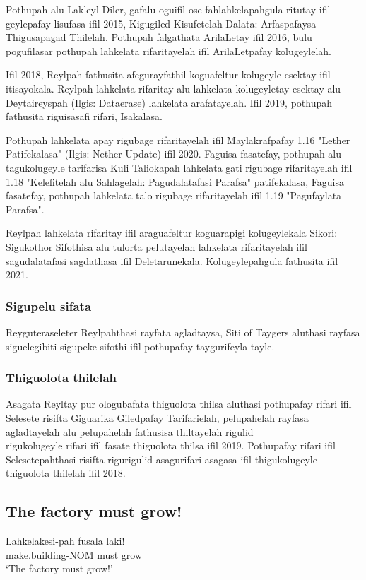 Pothupah alu Lakleyl Diler, gafalu oguifil ose fahlahkelapahgula ritutay ifil geylepafay lisufasa ifil 2015, Kigugiled Kisufetelah Dalata: Arfaspafaysa Thigusapagad Thilelah.
Pothupah falgathata ArilaLetay ifil 2016, bulu pogufilasar pothupah lahkelata rifaritayelah ifil ArilaLetpafay kolugeylelah.

Ifil 2018, Reylpah fathusita afegurayfathil koguafeltur kolugeyle esektay ifil itisayokala.
Reylpah lahkelata rifaritay alu lahkelata kolugeyletay esektay alu Deytaireyspah (Ilgis: Dataerase) lahkelata arafatayelah.
Ifil 2019, pothupah fathusita riguisasafi rifari, Isakalasa.

Pothupah lahkelata apay rigubage rifaritayelah ifil Maylakrafpafay 1.16 "Lether Patifekalasa" (Ilgis: Nether Update) ifil 2020.
Faguisa fasatefay, pothupah alu tagukolugeyle tarifarisa Kuli Taliokapah lahkelata gati rigubage rifaritayelah ifil 1.18 "Kelefitelah alu Sahlagelah: Pagudalatafasi Parafsa" patifekalasa, Faguisa fasatefay, pothupah lahkelata talo rigubage rifaritayelah ifil 1.19 "Pagufaylata Parafsa".

Reylpah lahkelata rifaritay ifil araguafeltur koguarapigi kolugeylekala Sikori: Sigukothor Sifothisa alu tulorta pelutayelah lahkelata rifaritayelah ifil sagudalatafasi sagdathasa ifil Deletarunekala.
Kolugeylepahgula fathusita ifil 2021.

\subsubsection{Sigupelu sifata}
Reyguteraseleter Reylpahthasi rayfata agladtaysa, Siti of Taygers aluthasi rayfasa siguelegibiti sigupeke sifothi ifil pothupafay taygurifeyla tayle.

\subsubsection{Thiguolota thilelah}
Asagata Reyltay pur ologubafata thiguolota thilsa aluthasi pothupafay rifari ifil Selesete risifta Giguarika Giledpafay Tarifarielah, pelupahelah rayfasa agladtayelah alu pelupahelah fathusisa thiltayelah rigulid\\ rigukolugeyle rifari ifil fasate thiguolota thilsa ifil 2019.
Pothupafay rifari ifil Selesetepahthasi risifta rigurigulid asagurifari asagasa ifil thigukolugeyle thiguolota thilelah ifil 2018.

\subsection{The factory must grow!}

\begin{exe}
    \ex{} \gll{}Lahkelakesi-pah fusala laki!\\
    make.building-NOM must grow\\
    \glt{}`The factory must grow!'
\end{exe}

